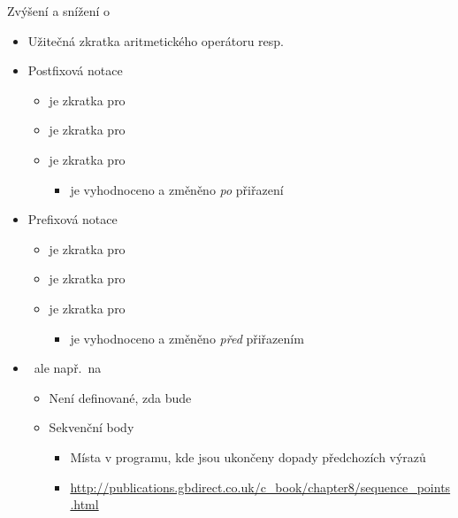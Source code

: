\begin{frame}{Zvýšení a snížení o }

  \begin{itemize}
    \item Užitečná zkratka aritmetického operátoru  resp.\ 

    \pause

    \item Postfixová notace
    \begin{itemize}
      \item {} je zkratka pro 
      \item {} je zkratka pro 

      \pause

      \item {} je zkratka pro 
      \begin{itemize}
	\item \code{++} je vyhodnoceno a  změněno \emph{po} přiřazení
      \end{itemize}
    \end{itemize}

    \pause

    \item Prefixová notace
    \begin{itemize}
      \item {} je zkratka pro 
      \item {} je zkratka pro 

      \pause

      \item {} je zkratka pro 
      \begin{itemize}
	\item \code{++} je vyhodnoceno a  změněno \emph{před} přiřazením
      \end{itemize}
    \end{itemize}

    \pause

    \item \pozor\ ale např.\ na 
    \begin{itemize}
      \item Není definované, zda  bude 

      \pause

      \item Sekvenční body
      \begin{itemize}
	\item Místa v programu, kde jsou ukončeny dopady předchozích výrazů
	\item \tinyL \url{http://publications.gbdirect.co.uk/c_book/chapter8/sequence_points.html}
      \end{itemize}
    \end{itemize}

  \end{itemize}

\end{frame}

